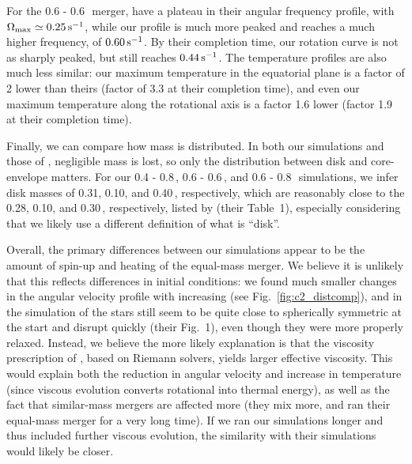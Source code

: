 For the 0.6 - 0.6\,\Msun\ merger, \citeal{loreig09} have a plateau in their angular frequency profile, with $\Omegamax\simeq0.25\,\psec$, while our profile is much more peaked and reaches a much higher frequency, of $0.60\,\psec$.  By their completion time, our rotation curve is not as sharply peaked, but still reaches $0.44\,\psec$.  The temperature profiles are also much less similar: our maximum temperature in the equatorial plane is a factor of 2 lower than theirs (factor of 3.3 at their completion time), and even our maximum temperature along the rotational axis is a factor 1.6 lower (factor 1.9 at their completion time).  

Finally, we can compare how mass is distributed.  In both our simulations and those of \citeal{loreig09}, negligible mass is lost, so only the distribution between disk and core-envelope matters.  For our 0.4 - 0.8\,\Msun, 0.6 - 0.6\,\Msun, and 0.6 - 0.8\,\Msun\ simulations, we infer disk masses  of 0.31, 0.10, and 0.40\,\Msun, respectively, which are reasonably close to the 0.28, 0.10, and 0.30\,\Msun, respectively, listed by \citeal{loreig09} (their Table~1), especially considering that we likely use a different definition of what is ``disk''.

Overall, the primary differences between our simulations appear to be the amount of spin-up and heating of the equal-mass merger.  We believe it is unlikely that this reflects differences in initial conditions: we found much smaller changes in the angular velocity profile with increasing {\azero} (see Fig.~\ref{fig:c2_distcomp}), and in the simulation of \citeal{loreig09} the stars still seem to be quite close to spherically symmetric at the start and disrupt quickly (their Fig.~1), even though they were more properly relaxed.  Instead, we believe the more likely explanation is that the viscosity prescription of \citeal{loreig09}, based on Riemann solvers, yields larger effective viscosity.  This would explain both the reduction in angular velocity and increase in temperature (since viscous evolution converts rotational into thermal energy), as well as the fact that similar-mass mergers are affected more (they mix more, and \citeal{loreig09} ran their equal-mass merger for a very long time).  If we ran our simulations longer and thus included further viscous evolution, the similarity with their simulations would likely be closer.

